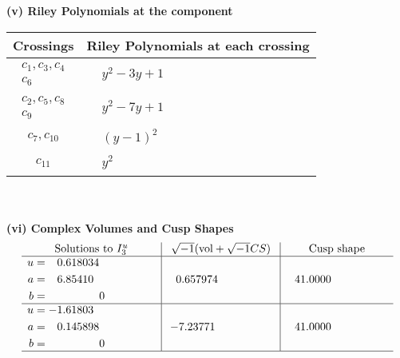 \documentclass[1p]{elsarticle_modified}
\theoremstyle{definition}
\newcommand{\I}{\sqrt{-1}}
\begin{document}
\newpage\renewcommand{\arraystretch}{1}
\flushleft \textbf{(v) Riley Polynomials at the component}\newline \\
\begin{tabular}{m{50pt}|m{274pt}}
Crossings & \hspace{64pt}Riley Polynomials at each crossing \\
\hline $$\begin{aligned}c_{1},c_{3},c_{4}\\c_{6}\end{aligned}$$&$\begin{aligned}
&y^2-3 y+1
\end{aligned}$\\
\hline $$\begin{aligned}c_{2},c_{5},c_{8}\\c_{9}\end{aligned}$$&$\begin{aligned}
&y^2-7 y+1
\end{aligned}$\\
\hline $$\begin{aligned}c_{7},c_{10}\end{aligned}$$&$\begin{aligned}
&(y-1)^2
\end{aligned}$\\
\hline $$\begin{aligned}c_{11}\end{aligned}$$&$\begin{aligned}
&y^2
\end{aligned}$\\
\hline
\end{tabular}\\~\\
\newpage\flushleft \textbf{(vi) Complex Volumes and Cusp Shapes}
$$\begin{array}{c|c|c}  
\text{Solutions to }I^u_{3}& \I (\text{vol} + \sqrt{-1}CS) & \text{Cusp shape}\\
 \hline 
\begin{aligned}
u &= \phantom{-}0.618034\phantom{ +0.000000I} \\
a &= \phantom{-}6.85410\phantom{ +0.000000I} \\
b &= \phantom{-0.000000 } 0\end{aligned}
 & \phantom{-}0.657974\phantom{ +0.000000I} & \phantom{-}41.0000\phantom{ +0.000000I} \\ \hline\begin{aligned}
u &= -1.61803\phantom{ +0.000000I} \\
a &= \phantom{-}0.145898\phantom{ +0.000000I} \\
b &= \phantom{-0.000000 } 0\end{aligned}
 & -7.23771\phantom{ +0.000000I} & \phantom{-}41.0000\phantom{ +0.000000I}\\
 \hline 
 \end{array}$$\newpage
\end{document}
